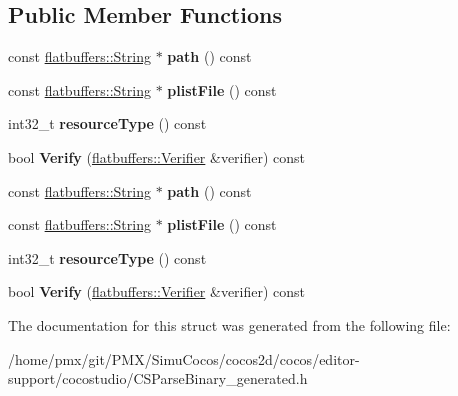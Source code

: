 \subsection*{Public Member Functions}
\begin{DoxyCompactItemize}
\item 
\mbox{\label{structflatbuffers_1_1ResourceData_a368bec0c93f06d788597fafc3bc34f3b}} 
const \hyperlink{structflatbuffers_1_1String}{flatbuffers\+::\+String} $\ast$ {\bfseries path} () const
\item 
\mbox{\label{structflatbuffers_1_1ResourceData_a23b8a7ca81313856ef958fde7b4cfb9e}} 
const \hyperlink{structflatbuffers_1_1String}{flatbuffers\+::\+String} $\ast$ {\bfseries plist\+File} () const
\item 
\mbox{\label{structflatbuffers_1_1ResourceData_afc74b0f389b8615069e6e6c6180c0a0d}} 
int32\+\_\+t {\bfseries resource\+Type} () const
\item 
\mbox{\label{structflatbuffers_1_1ResourceData_a8c972cf6eed4a8c9482f1ea172bbf6a6}} 
bool {\bfseries Verify} (\hyperlink{classflatbuffers_1_1Verifier}{flatbuffers\+::\+Verifier} \&verifier) const
\item 
\mbox{\label{structflatbuffers_1_1ResourceData_a368bec0c93f06d788597fafc3bc34f3b}} 
const \hyperlink{structflatbuffers_1_1String}{flatbuffers\+::\+String} $\ast$ {\bfseries path} () const
\item 
\mbox{\label{structflatbuffers_1_1ResourceData_a23b8a7ca81313856ef958fde7b4cfb9e}} 
const \hyperlink{structflatbuffers_1_1String}{flatbuffers\+::\+String} $\ast$ {\bfseries plist\+File} () const
\item 
\mbox{\label{structflatbuffers_1_1ResourceData_afc74b0f389b8615069e6e6c6180c0a0d}} 
int32\+\_\+t {\bfseries resource\+Type} () const
\item 
\mbox{\label{structflatbuffers_1_1ResourceData_a8c972cf6eed4a8c9482f1ea172bbf6a6}} 
bool {\bfseries Verify} (\hyperlink{classflatbuffers_1_1Verifier}{flatbuffers\+::\+Verifier} \&verifier) const
\end{DoxyCompactItemize}


The documentation for this struct was generated from the following file\+:\begin{DoxyCompactItemize}
\item 
/home/pmx/git/\+P\+M\+X/\+Simu\+Cocos/cocos2d/cocos/editor-\/support/cocostudio/C\+S\+Parse\+Binary\+\_\+generated.\+h\end{DoxyCompactItemize}
